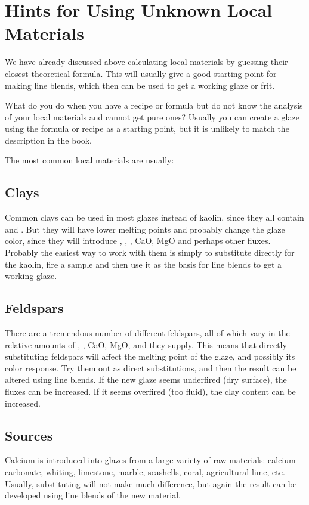 \section{Hints for Using Unknown Local Materials}
We have already discussed above calculating local materials by guessing their 
closest theoretical formula. This will usually give a good starting point for 
making line blends, which then can be used to get a working glaze or frit.

What do you do when you have a recipe or formula but do not know the analysis 
of your local materials and cannot get pure ones? Usually you can create a 
glaze using the formula or recipe as a starting point, but it is unlikely to 
match the description in the book.

The most common local materials are usually:
\subsection{Clays}
Common clays can be used in most glazes instead of kaolin, since they all 
contain  and . But they will have lower melting points and 
probably change the glaze color, since they will introduce , , 
, CaO, MgO and perhaps other fluxes. Probably the easiest way to work 
with them is simply to substitute directly for the kaolin, fire a sample and 
then use it as the basis for line blends to get a working glaze.
\subsection{Feldspars}
There are a tremendous number of different feldspars, all of which vary in the 
relative amounts of , , CaO, MgO,  and  
they supply. This means that directly substituting feldspars will affect the 
melting point of the glaze, and possibly its color response. Try them out as 
direct substitutions, and then the result can be altered using line blends. If 
the new glaze seems underfired (dry surface), the fluxes can be increased. If 
it seems overfired (too fluid), the clay content can be increased.
\subsection{ Sources}
Calcium is introduced into glazes from a large variety of raw materials: 
calcium carbonate, whiting, limestone, marble, seashells, coral, agricultural 
lime, etc. Usually, substituting will not make much difference, but again the 
result can be developed using line blends of the new material.
